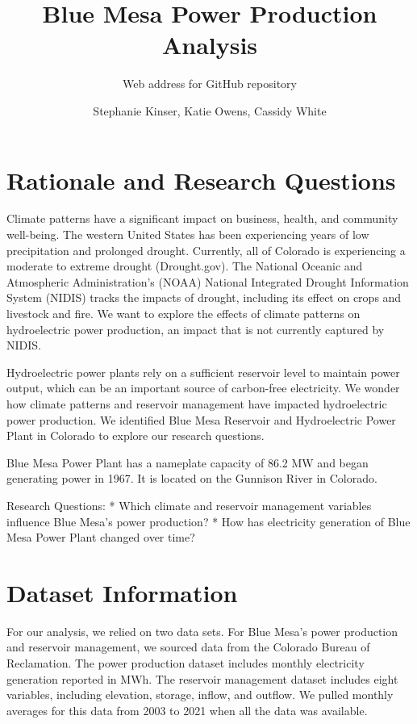 \documentclass[
  12pt,
]{article}
\title{Blue Mesa Power Production Analysis}
\subtitle{Web address for GitHub repository}
\author{Stephanie Kinser, Katie Owens, Cassidy White}
\date{}
\begin{document}
\maketitle

\newpage
\tableofcontents 
\newpage
\listoftables 
\newpage
\listoffigures 
\newpage

\hypertarget{rationale-and-research-questions}{%
\section{Rationale and Research
Questions}\label{rationale-and-research-questions}}

Climate patterns have a significant impact on business, health, and
community well-being. The western United States has been experiencing
years of low precipitation and prolonged drought. Currently, all of
Colorado is experiencing a moderate to extreme drought (Drought.gov).
The National Oceanic and Atmospheric Administration's (NOAA) National
Integrated Drought Information System (NIDIS) tracks the impacts of
drought, including its effect on crops and livestock and fire. We want
to explore the effects of climate patterns on hydroelectric power
production, an impact that is not currently captured by NIDIS.

Hydroelectric power plants rely on a sufficient reservoir level to
maintain power output, which can be an important source of carbon-free
electricity. We wonder how climate patterns and reservoir management
have impacted hydroelectric power production. We identified Blue Mesa
Reservoir and Hydroelectric Power Plant in Colorado to explore our
research questions.

Blue Mesa Power Plant has a nameplate capacity of 86.2 MW and began
generating power in 1967. It is located on the Gunnison River in
Colorado.

Research Questions: * Which climate and reservoir management variables
influence Blue Mesa's power production? * How has electricity generation
of Blue Mesa Power Plant changed over time?

\newpage

\hypertarget{dataset-information}{%
\section{Dataset Information}\label{dataset-information}}

For our analysis, we relied on two data sets. For Blue Mesa's power
production and reservoir management, we sourced data from the Colorado
Bureau of Reclamation. The power production dataset includes monthly
electricity generation reported in MWh. The reservoir management dataset
includes eight variables, including elevation, storage, inflow, and
outflow. We pulled monthly averages for this data from 2003 to 2021 when
all the data was available.
\end{document}
